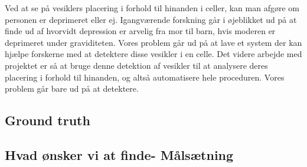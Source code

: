 Ved at se på vesiklers placering i forhold til hinanden i celler, kan man afgøre om personen er deprimeret eller ej. Igangværende forskning går i øjeblikket ud på at finde ud af hvorvidt depression er arvelig fra mor til barn, hvis moderen er deprimeret under graviditeten. Vores problem går ud på at lave et system der kan hjælpe forskerne med at detektere disse vesikler i en celle. Det videre arbejde med projektet er så at bruge denne detektion af vesikler til at analysere deres placering i forhold til hinanden, og altså automatisere hele proceduren. Vores problem går bare ud på at detektere.

\subsection{Ground truth}									%
\subsection{Hvad ønsker vi at finde- Målsætning}			%

